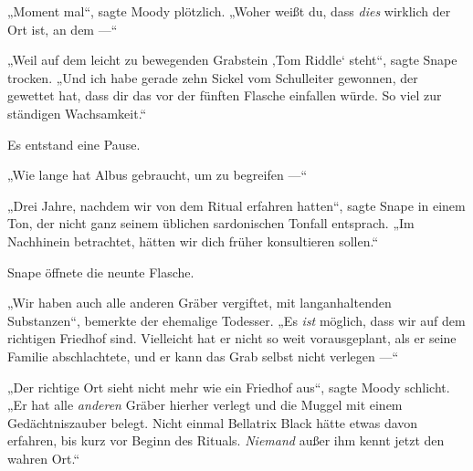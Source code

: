 „Moment mal“, sagte Moody plötzlich.
„Woher weißt du, dass \emph{dies} wirklich der Ort ist, an dem —“

„Weil auf dem leicht zu bewegenden Grabstein ‚Tom Riddle‘ steht“, sagte Snape trocken.
„Und ich habe gerade zehn Sickel vom Schulleiter gewonnen, der gewettet hat, dass dir das vor der fünften Flasche einfallen würde. So viel zur ständigen Wachsamkeit.“

Es entstand eine Pause.

„Wie lange hat Albus gebraucht, um zu begreifen —“

„Drei Jahre, nachdem wir von dem Ritual erfahren hatten“, sagte Snape in einem Ton, der nicht ganz seinem üblichen sardonischen Tonfall entsprach.
„Im Nachhinein betrachtet, hätten wir dich früher konsultieren sollen.“

Snape öffnete die neunte Flasche.

„Wir haben auch alle anderen Gräber vergiftet, mit langanhaltenden Substanzen“, bemerkte der ehemalige Todesser.
„Es \emph{ist} möglich, dass wir auf dem richtigen Friedhof sind. Vielleicht hat er nicht so weit vorausgeplant, als er seine Familie abschlachtete, und er kann das Grab selbst nicht verlegen —“

„Der richtige Ort sieht nicht mehr wie ein Friedhof aus“, sagte Moody schlicht.
„Er hat alle \emph{anderen} Gräber hierher verlegt und die Muggel mit einem Gedächtniszauber belegt. Nicht einmal Bellatrix Black hätte etwas davon erfahren, bis kurz vor Beginn des Rituals. \emph{Niemand} außer ihm kennt jetzt den wahren Ort.“

